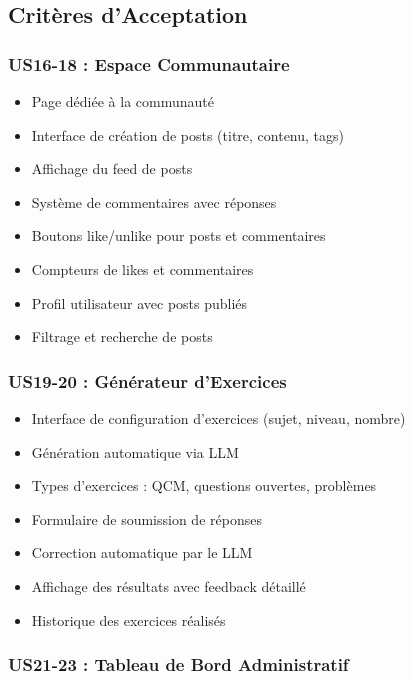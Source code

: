 \subsection{Critères d'Acceptation}

\subsubsection{US16-18 : Espace Communautaire}

\begin{itemize}
    \item Page dédiée à la communauté
    \item Interface de création de posts (titre, contenu, tags)
    \item Affichage du feed de posts
    \item Système de commentaires avec réponses
    \item Boutons like/unlike pour posts et commentaires
    \item Compteurs de likes et commentaires
    \item Profil utilisateur avec posts publiés
    \item Filtrage et recherche de posts
\end{itemize}

\subsubsection{US19-20 : Générateur d'Exercices}

\begin{itemize}
    \item Interface de configuration d'exercices (sujet, niveau, nombre)
    \item Génération automatique via LLM
    \item Types d'exercices : QCM, questions ouvertes, problèmes
    \item Formulaire de soumission de réponses
    \item Correction automatique par le LLM
    \item Affichage des résultats avec feedback détaillé
    \item Historique des exercices réalisés
\end{itemize}

\subsubsection{US21-23 : Tableau de Bord Administratif}

